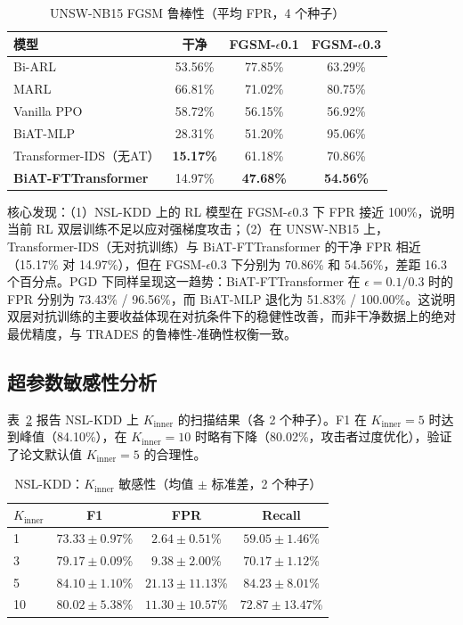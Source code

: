 \documentclass[12pt,a4paper]{ctexart}
\begin{document}
\begin{table}[H]
\centering
\caption{UNSW-NB15 FGSM 鲁棒性（平均 FPR，4 个种子）}
\label{tab:rob_unsw_cn}
\begin{tabular}{lccc}
\toprule
\textbf{模型} & \textbf{干净} & \textbf{FGSM-$\epsilon$0.1} & \textbf{FGSM-$\epsilon$0.3} \\
\midrule
Bi-ARL               & 53.56\% & 77.85\% & 63.29\% \\
MARL                 & 66.81\% & 71.02\% & 80.75\% \\
Vanilla PPO          & 58.72\% & 56.15\% & 56.92\% \\
BiAT-MLP             & 28.31\% & 51.20\% & 95.06\% \\
Transformer-IDS（无AT）& \textbf{15.17\%} & 61.18\% & 70.86\% \\
\textbf{BiAT-FTTransformer} & 14.97\% & \textbf{47.68\%} & \textbf{54.56\%} \\
\bottomrule
\end{tabular}
\end{table}

核心发现：（1）NSL-KDD 上的 RL 模型在 FGSM-$\epsilon$0.3 下 FPR 接近 100\%，说明当前 RL 双层训练不足以应对强梯度攻击；（2）在 UNSW-NB15 上，Transformer-IDS（无对抗训练）与 BiAT-FTTransformer 的干净 FPR 相近（15.17\% 对 14.97\%），但在 FGSM-$\epsilon$0.3 下分别为 70.86\% 和 54.56\%，差距 16.3 个百分点。PGD 下同样呈现这一趋势：BiAT-FTTransformer 在 $\epsilon=0.1/0.3$ 时的 FPR 分别为 73.43\% / 96.56\%，而 BiAT-MLP 退化为 51.83\% / 100.00\%。这说明双层对抗训练的主要收益体现在对抗条件下的稳健性改善，而非干净数据上的绝对最优精度，与 TRADES 的鲁棒性-准确性权衡一致。

\subsection{超参数敏感性分析}

表~\ref{tab:kinner_cn} 报告 NSL-KDD 上 $K_{\text{inner}}$ 的扫描结果（各 2 个种子）。F1 在 $K_{\text{inner}}=5$ 时达到峰值（84.10\%），在 $K_{\text{inner}}=10$ 时略有下降（80.02\%，攻击者过度优化），验证了论文默认值 $K_{\text{inner}}=5$ 的合理性。

\begin{table}[H]
\centering
\caption{NSL-KDD：$K_{\text{inner}}$ 敏感性（均值 $\pm$ 标准差，2 个种子）}
\label{tab:kinner_cn}
\begin{tabular}{lccc}
\toprule
$K_{\text{inner}}$ & \textbf{F1} & \textbf{FPR} & \textbf{Recall} \\
\midrule
1  & $73.33{\pm}0.97$\% & $2.64{\pm}0.51$\%   & $59.05{\pm}1.46$\% \\
3  & $79.17{\pm}0.09$\% & $9.38{\pm}2.00$\%   & $70.17{\pm}1.12$\% \\
5  & $\mathbf{84.10{\pm}1.10}$\% & $21.13{\pm}11.13$\% & $84.23{\pm}8.01$\% \\
10 & $80.02{\pm}5.38$\% & $11.30{\pm}10.57$\% & $72.87{\pm}13.47$\% \\
\bottomrule
\end{tabular}
\end{table}
\end{document}
